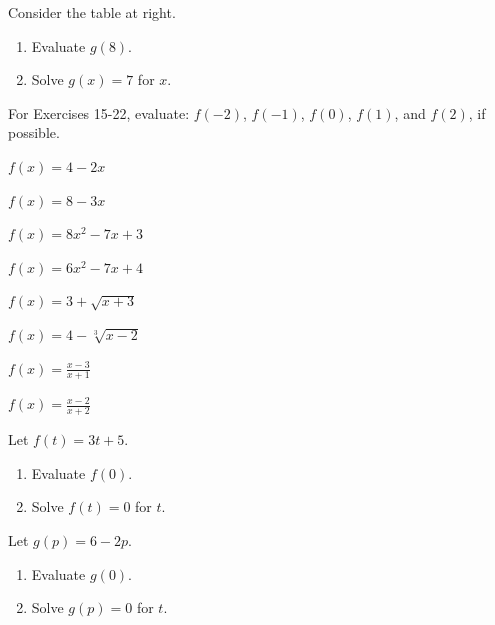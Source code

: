 \begin{enumerate}
\begin{minipage}{\linewidth}
\item  Consider the table at right.
\begin{enumerate}
    \item Evaluate $g(8)$.
    \item Solve $g(x) = 7$ for $x$.
\end{enumerate}
\end{minipage}

\vspace{24pt}

\noindent For Exercises 15-22, evaluate: $f(-2)$, $f(-1)$, $f(0)$, $f(1)$, and $f(2)$, if possible.

\item $f(x) = 4 - 2 x$
\item $f(x) = 8-3x$
\item $f(x) = 8x^2 - 7x + 3$
\item $f(x) = 6x^2 - 7x + 4$
\item $f(x) = 3 + \sqrt{x+3}$
\item $f(x) = 4 - \sqrt[3]{x-2}$
\item $f(x) = \frac{x-3}{x+1}$
\item $f(x) = \frac{x-2}{x+2}$

\item Let $f(t) = 3t+5$.
\begin{enumerate}
    \item Evaluate $f(0)$.
    \item Solve $f(t) = 0$ for $t$.
\end{enumerate}

\item Let $g(p) = 6-2p$.
\begin{enumerate}
    \item Evaluate $g(0)$.
    \item Solve $g(p) = 0$ for $t$.
\end{enumerate}


\end{enumerate}
